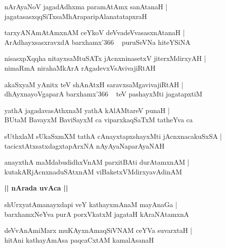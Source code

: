 \documentclass[twoside,12pt,openright]{book}
\newcounter{shloka}[chapter]
\def\uvaca#1{\centerline{{\large\textbf{#1}}}}
\begin{document}
\begin{shloka}%
nArAyaNoV jagadAdhxma paramAtAmx sanAtanaH |\\
jagatasasxqqSiTxsaMhAraparipAlanatatapxraH 
\end{shloka}

\begin{shloka}%
tarxyANAmAtAmxnAM ceYkoV deVvadeVvasasxnAtanaH |\\
ArAdhayxsasxravxdA barxhamx\char'366 ~ puruSeVNa hiteYSiNA
\end{shloka}

\begin{shloka}%
nisasxpXqqha nitayxsaMtuSATx jAcnxninasetxV jiterxMdirxyAH |\\
nimaRmA nirahaMkArA rAgadevxVsAvivajiRtAH 
\end{shloka}

\begin{shloka}%
akaSxyaM yAnitx teV shAnAtxH saravxsaMgavivajiRtAH |\\
dhAyxnayoVgaparA barxhamx\char'366 ~ teV pashayxMti jagatapxtiM 
\end{shloka}

\begin{shloka}%
yathA jagadavasAthxnaM yathA kAlAMtareV punaH |\\
BUtaM BavayxM BaviSayxM ca viparxkaqSaTxM tatheYva ca 
\end{shloka}

\begin{shloka}%
sUthxlaM sUkaSxmXM tathA cAnayxtapxshayxMti jAcnxnacakuSxSA |\\
tacicxtAtxsatxdagxtapArxNA nAyAyaNaparAyaNAH 
\end{shloka}

\begin{shloka}%
anayxthA maMdabudidhxVnAM parxitBAti durAtamxnAM |\\
kutakARjAcnxnaduSAtxnAM viBaketxVMdirxyavAdinAM 
\end{shloka}

\uvaca{|| nArada uvAca ||}

\begin{shloka}%
shUrxyatAmanayxdapi veY kathayxmAnaM mayAnaGa |\\
barxhamxNeYva purA porxVkatxM jagataH kAraNAtamxnA 
\end{shloka}

\begin{shloka}%
deVvAnAmiMarx muKAyxnAmaqSiVNAM ceYVa suvarxtaH |\\
hitAni kathayAmAsa paqcaCxtAM kamalAsanaH 
\end{shloka}
\end{document}
